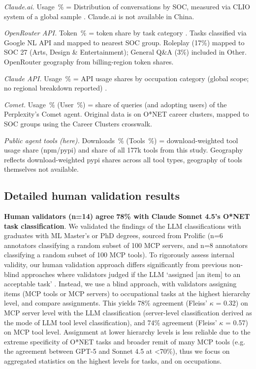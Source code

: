 \documentclass[manuscript,screen,nonacm,oneside]{acmart}
\begin{document}
\begin{table}[htbp]
\begin{minipage}{\linewidth}
\textit{Claude.ai.} Usage~\% = Distribution of conversations by SOC, measured via CLIO system of a global sample \citep{anthropic2026aeiv4}. Claude.ai is not available in China.

\textit{OpenRouter API.} Token~\% = token share by task category \citep{aubakirova2025state}. Tasks classified via Google NL API and mapped to nearest SOC group. Roleplay (17\%) mapped to SOC 27 (Arts, Design \& Entertainment); General Q\&A (3\%) included in Other. OpenRouter geography from billing-region token shares.

\textit{Claude API.} Usage~\% = API usage shares by occupation category (global scope; no regional breakdown reported) \citep{anthropic2026aeiv4}.

\textit{Comet.} Usage~\% (User~\%) = share of queries (and adopting users) of the Perplexity's Comet agent. Original data is on O*NET career clusters, mapped to SOC groups using the Career Clusters crosswalk. \citep{yang2025adoption}

\textit{Public agent tools (here).} Downloads~\% (Tools~\%) = download-weighted tool usage share (npm/pypi) and share of all 177k tools from this study. Geography reflects download-weighted pypi shares across all tool types, geography of tools themselves not available.
\end{minipage}
\end{table}

\subsection{Detailed human validation results}
\label{app:validation}

\textbf{Human validators (n=14) agree} \textbf{78\% with Claude Sonnet 4.5's O*NET task classification}. We validated the findings of the LLM classifications with graduates with ML Master's or PhD degrees, sourced from Prolific (n=6 annotators classifying a random subset of 100 MCP servers, and n=8 annotators classifying a random subset of 100 MCP tools). To rigorously assess internal validity, our human validation approach differs significantly from previous non-blind approaches where validators judged if the LLM `assigned {[}an item{]} to an acceptable task' \citep[see][supplementary materials]{handa2025which}. Instead, we use a blind approach, with validators assigning items (MCP tools or MCP servers) to occupational tasks at the highest hierarchy level, and compare assignments. This yields 78\% agreement (Fleiss' $\kappa$ = 0.32) on MCP server level with the LLM classification (server-level classification derived as the mode of LLM tool level classification), and 74\% agreement (Fleiss' $\kappa$ = 0.57) on MCP tool level. Assignment at lower hierarchy levels is less reliable due to the extreme specificity of O*NET tasks and broader remit of many MCP tools (e.g. the agreement between GPT-5 and Sonnet 4.5 at \textless70\%), thus we focus on aggregated statistics on the highest levels for tasks, and on occupations.
\end{document}
